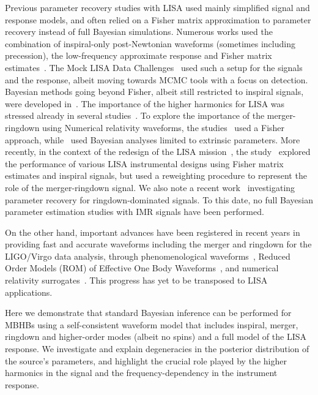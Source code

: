 \documentclass[aps,showpacs,twocolumn,prd,superscriptaddress,nofootinbib]{revtex4-1}
\begin{document}
Previous parameter recovery studies with LISA used mainly simplified signal and response models, and often relied on a Fisher matrix approximation to parameter recovery instead of full Bayesian simulations. Numerous works used the combination of inspiral-only post-Newtonian waveforms (sometimes including precession), the low-frequency approximate response and Fisher matrix estimates~\cite{Cutler97, Vecchio03, Arun06, Berti+04, LangHughes06}. The Mock LISA Data Challenges~\cite{MLDC09} used such a setup for the signals and the response, albeit moving towards MCMC tools with a focus on detection. Bayesian methods going beyond Fisher, albeit still restricted to inspiral signals, were developed in~\cite{Brown+07, CornishPorter06a, Crowder+06, Wickham+06, Roever+07, Feroz+09, GairPorter09, Petiteau+09, PorterCarre13, PorterCornish15}. The importance of the higher harmonics for LISA was stressed already in several studies~\cite{Arun+07a, TriasSintes07, PorterCornish08, McWilliams+09}. To explore the importance of the merger-ringdown using Numerical relativity waveforms, the studies~\cite{Thorpe+08, McWilliams+09, McWilliams+10, McWilliams+11} used a Fisher approach, while~\cite{Babak+08} used Bayesian analyses limited to extrinsic parameters. More recently, in the context of the redesign of the LISA mission~\cite{elisa13}, the study~\cite{Klein+15} explored the performance of various LISA instrumental designs using Fisher matrix estimates and inspiral signals, but used a reweighting procedure to represent the role of the merger-ringdown signal. We also note a recent work~\cite{Baibhav+20} investigating parameter recovery for ringdown-dominated signals. To this date, no full Bayesian parameter estimation studies with IMR signals have been performed.

On the other hand, important advances have been registered in recent years in providing fast and accurate waveforms including the merger and ringdown for the LIGO/Virgo data analysis, through phenomenological waveforms~\cite{Khan+15, London+17}, Reduced Order Models (ROM) of Effective One Body Waveforms~\cite{Puerrer14, Bohe+16}, and numerical relativity surrogates~\cite{Blackman+17b, Varma+18}. This progress has yet to be transposed to LISA applications.

Here we demonstrate that standard Bayesian inference can be performed for MBHBs using a self-consistent waveform model that includes inspiral, merger, ringdown and higher-order modes (albeit no spins) and a full model of the LISA response. We investigate and explain degeneracies in the posterior distribution of the source's parameters, and highlight the crucial role played by the higher harmonics in the signal and the frequency-dependency in the instrument response.
\end{document}
